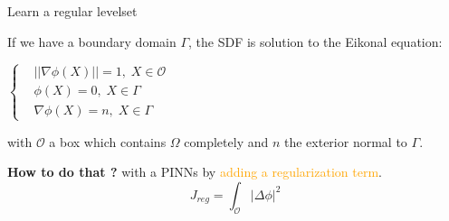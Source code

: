 \begin{frame}{Learn a regular levelset}	
	\vspace{-10pt}
	\begin{tcolorbox}[
		colback=other, %
		colframe=other, %
		arc=2mm, %
		boxrule=0.5pt, %
		breakable, enhanced jigsaw,
		width=\linewidth,
		opacityback=0.1
		]
		
		If we have a boundary domain $\Gamma$, the SDF is solution to the Eikonal equation:
		
		\begin{minipage}{\linewidth}
			\centering
			$\left\{\begin{aligned}
				&||\nabla\phi(X)||=1, \; X\in\mathcal{O} \\
				&\phi(X)=0, \; X\in\Gamma \\
				&\nabla\phi(X)=n, \; X\in\Gamma
			\end{aligned}\right.$
		\end{minipage}
		
		with $\mathcal{O}$ a box which contains $\Omega$ completely and $n$ the exterior normal to $\Gamma$.
	\end{tcolorbox}

	\textbf{How to do that ?} with a PINNs \cite{clemot_neural_2023} by \textcolor{orange}{adding a regularization term}.
	\vspace{-5pt}
	\begin{equation*}
		J_{reg} = \int_\mathcal{O} |\Delta\phi|^2
	\end{equation*}

	\begin{minipage}{0.32\linewidth}
		\centering
	\end{minipage} 
	\begin{minipage}{0.32\linewidth}
		\centering
	\end{minipage} 
	\begin{minipage}{0.32\linewidth}
		\centering
	\end{minipage} 
\end{frame}

